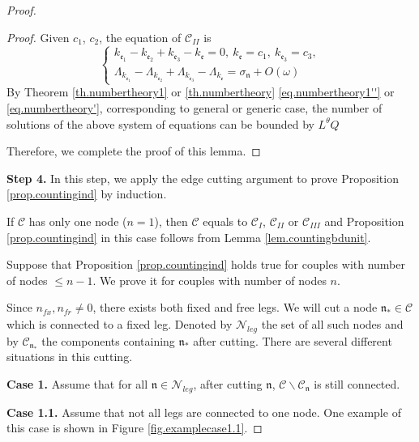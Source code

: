 \begin{proof}
\begin{proof}
    Given $c_1$, $c_2$, the equation of $\mathcal{C}_{II}$ is 
    \begin{equation}
        \begin{cases}
        k_{\mathfrak{e}_1}-k_{\mathfrak{e}_2}+k_{\mathfrak{e}_3}-k_{\mathfrak{e}}=0,\ k_{\mathfrak{e}}=c_1,\ k_{\mathfrak{e}_3}=c_3,
        \\
        \Lambda_{k_{\mathfrak{e}_1}}-\Lambda_{k_{\mathfrak{e}_2}}+\Lambda_{k_{\mathfrak{e}_3}}-\Lambda_{k_{\mathfrak{e}}}=\sigma_{\mathfrak{n}}+O(\omega)
        \end{cases}
    \end{equation}
    By Theorem \ref{th.numbertheory1} or \ref{th.numbertheory} \eqref{eq.numbertheory1''} or \eqref{eq.numbertheory'}, corresponding to general or generic case, the number of solutions of the above system of equations can be bounded by $ L^\theta Q$
    
    Therefore, we complete the proof of this lemma.
    \end{proof}

\textbf{Step 4.} In this step, we apply the edge cutting argument to prove Proposition \ref{prop.countingind} by induction.

If $\mathcal{C}$ has only one node ($n=1$), then $\mathcal{C}$ equals to $\mathcal{C}_{I}$, $\mathcal{C}_{II}$ or $\mathcal{C}_{III}$ and Proposition \ref{prop.countingind} in this case follows from Lemma \ref{lem.countingbdunit}.

Suppose that Proposition \ref{prop.countingind} holds true for couples with number of nodes $\le n-1$. We prove it for couples with number of nodes $n$. 

Since $n_{\textit{fx}}, n_{\textit{fr}}\ne 0$, there exists both fixed and free legs. We will cut a node $\mathfrak{n}_*\in\mathcal{C}$ which is connected to a fixed leg. Denoted by $\mathcal{N}_{leg}$ the set of all such nodes and by $\mathcal{C}_{\mathfrak{n}_*}$ the components containing $\mathfrak{n}_*$ after cutting. There are several different situations in this cutting.

\textbf{Case 1.} Assume that for all $\mathfrak{n}\in \mathcal{N}_{leg}$, after cutting $\mathfrak{n}$, $\mathcal{C}\backslash \mathcal{C}_{\mathfrak{n}}$ is still connected.

\textbf{Case 1.1.} Assume that not all legs are connected to one node. One example of this case is shown in Figure \ref{fig.examplecase1.1}.


\end{proof}
